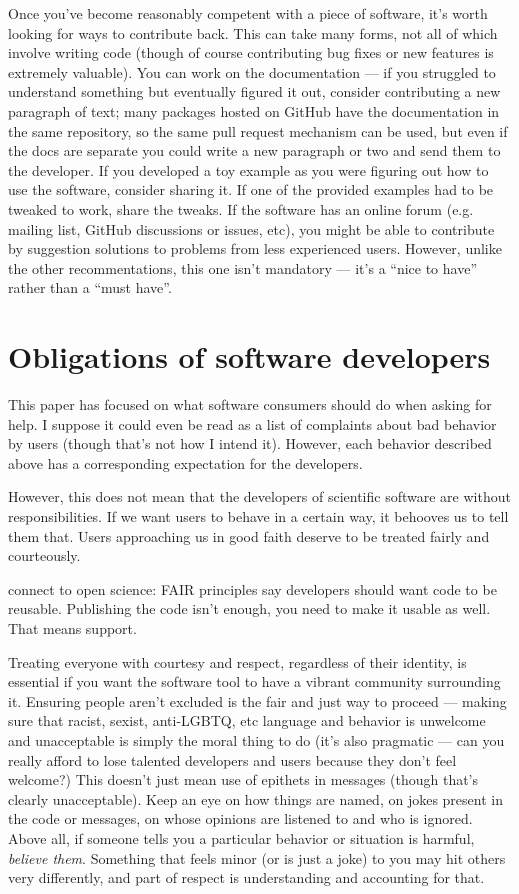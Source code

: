 \documentclass[9pt,training]{livecoms}
\begin{document}
Once you've become reasonably competent with a piece of software, it's worth
looking for ways to contribute back. This can take many forms, not all of which
involve writing code (though of course contributing bug fixes or new features is
extremely valuable). You can work on the documentation --- if you struggled to
understand something but eventually figured it out, consider contributing a new
paragraph of text; many packages hosted on GitHub have the documentation in the
same repository, so the same pull request mechanism can be used, but even if the
docs are separate you could write a new paragraph or two and send them to the
developer. If you developed a toy example as you were figuring out how to use
the software, consider sharing it. If one of the provided examples had to be
tweaked to work, share the tweaks. If the software has an online forum (e.g.
mailing list, GitHub discussions or issues, etc), you might be able to
contribute by suggestion solutions to problems from less experienced users. However, unlike the other recommentations, this one isn't mandatory --- it's a ``nice to have'' rather than a ``must have''.

\section{Obligations of software developers}

This paper has focused on what software consumers should do when asking for
help.  I suppose it could even be read as a list of complaints about bad
behavior by users (though that's not how I intend it). However, each behavior
described above has a corresponding expectation for the developers.

However, this does not mean that the developers of scientific
software are without responsibilities. If we want users to behave in a certain
way, it behooves us to tell them that. Users approaching us in good faith
deserve to be treated fairly and courteously.

connect to open science: FAIR principles say developers should want code to be
reusable. Publishing the code isn't enough, you need to make it usable as well.
That means support.

Treating everyone with courtesy and respect, regardless of their identity, is
essential if you want the software tool to have a vibrant community surrounding
it. Ensuring people aren't excluded is the fair and just way to proceed ---
making sure that racist, sexist, anti-LGBTQ, etc language and behavior is
unwelcome and unacceptable is simply the moral thing to do (it's also pragmatic
--- can you really afford to lose talented developers and users because they
don't feel welcome?) This doesn't just mean use of epithets in messages (though
that's clearly unacceptable). Keep an eye on how things are named, on jokes
present in the code or messages, on whose opinions are listened to and who is
ignored.  Above all, if someone tells you a particular behavior or situation is
harmful, \emph{believe them}. Something that feels minor (or is just a joke) to
you may hit others very differently, and part of respect is understanding and
accounting for that.
\end{document}
